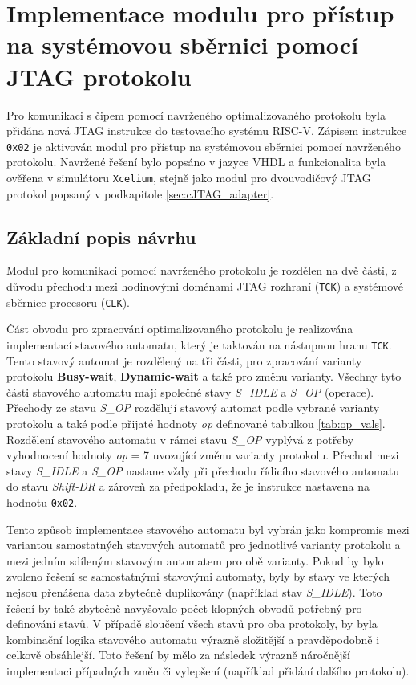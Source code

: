 \section{Implementace modulu pro přístup na systémovou sběrnici pomocí \acs{JTAG} protokolu}
Pro komunikaci s čipem pomocí navrženého optimalizovaného protokolu byla přidána nová \acs{JTAG} instrukce do testovacího systému \acs{RISC-V}. Zápisem instrukce \texttt{0x02} je aktivován modul pro přístup na systémovou sběrnici pomocí navrženého protokolu. Navržené řešení bylo popsáno v jazyce \acs{VHDL} a funkcionalita byla ověřena v simulátoru \texttt{Xcelium}, stejně jako modul pro dvouvodičový \acs{JTAG} protokol popsaný v podkapitole \ref{sec:cJTAG_adapter}.

\subsection{Základní popis návrhu}	\label{subsec:jtag_ap_impl}
Modul pro komunikaci pomocí navrženého protokolu je rozdělen na dvě části, z důvodu přechodu mezi hodinovými doménami \acs{JTAG} rozhraní (\texttt{\acs{TCK}}) a systémové sběrnice procesoru (\texttt{CLK}).

Část obvodu pro zpracování optimalizovaného protokolu je realizována implementací stavového automatu, který je taktován na nástupnou hranu \texttt{\acs{TCK}}. Tento stavový automat je rozdělený na tři části, pro zpracování varianty protokolu \textbf{Busy-wait}, \textbf{Dynamic-wait} a také pro změnu varianty. Všechny tyto části stavového automatu mají společné stavy \textit{S\_IDLE} a \textit{S\_OP} (operace). Přechody ze stavu \textit{S\_OP} rozdělují stavový automat podle vybrané varianty protokolu a také podle přijaté hodnoty \textit{op} definované tabulkou \ref{tab:op_vals}. Rozdělení stavového automatu v rámci stavu \textit{S\_OP} vyplývá z potřeby vyhodnocení hodnoty \textit{op} = 7 uvozující změnu varianty protokolu. Přechod mezi stavy \textit{S\_IDLE} a \textit{S\_OP} nastane vždy při přechodu řídicího stavového automatu do stavu \textit{Shift-DR} a zároveň za předpokladu, že je instrukce nastavena na hodnotu \texttt{0x02}.

Tento způsob implementace stavového automatu byl vybrán jako kompromis mezi variantou samostatných stavových automatů pro jednotlivé varianty protokolu a mezi jedním sdíleným stavovým automatem pro obě varianty. Pokud by bylo zvoleno řešení se samostatnými stavovými automaty, byly by stavy ve kterých nejsou přenášena data zbytečně duplikovány (například stav \textit{S\_IDLE}). Toto řešení by také zbytečně navyšovalo počet klopných obvodů potřebný pro definování stavů. V případě sloučení všech stavů pro oba protokoly, by byla kombinační logika stavového automatu výrazně složitější a pravděpodobně i celkově obsáhlejší. Toto řešení by mělo za následek výrazně náročnější implementaci případných změn či vylepšení (například přidání dalšího protokolu).

